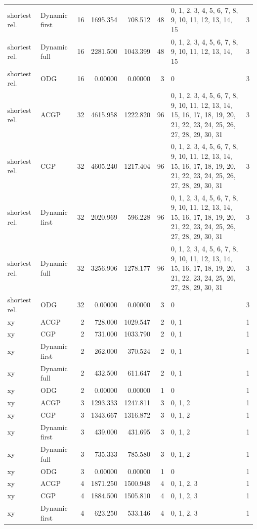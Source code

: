 \documentclass[10pt,a4paper]{article}
\begin{document}
\begin{longtable}{@{}p{23mm}p{29mm}rrrrp{36mm}r@{}}
shortest rel. & Dynamic first & 16 & 1695.354 & 708.512 & 48 & 0, 1, 2, 3, 4, 5, 6, 7, 8, 9, 10, 11, 12, 13, 14, 15 & 3 \\
shortest rel. & Dynamic full & 16 & 2281.500 & 1043.399 & 48 & 0, 1, 2, 3, 4, 5, 6, 7, 8, 9, 10, 11, 12, 13, 14, 15 & 3 \\
shortest rel. & ODG & 16 & 0.00000 & 0.00000 & 3 & 0 & 3 \\
shortest rel. & ACGP & 32 & 4615.958 & 1222.820 & 96 & 0, 1, 2, 3, 4, 5, 6, 7, 8, 9, 10, 11, 12, 13, 14, 15, 16, 17, 18, 19, 20, 21, 22, 23, 24, 25, 26, 27, 28, 29, 30, 31 & 3 \\
shortest rel. & CGP & 32 & 4605.240 & 1217.404 & 96 & 0, 1, 2, 3, 4, 5, 6, 7, 8, 9, 10, 11, 12, 13, 14, 15, 16, 17, 18, 19, 20, 21, 22, 23, 24, 25, 26, 27, 28, 29, 30, 31 & 3 \\
shortest rel. & Dynamic first & 32 & 2020.969 & 596.228 & 96 & 0, 1, 2, 3, 4, 5, 6, 7, 8, 9, 10, 11, 12, 13, 14, 15, 16, 17, 18, 19, 20, 21, 22, 23, 24, 25, 26, 27, 28, 29, 30, 31 & 3 \\
shortest rel. & Dynamic full & 32 & 3256.906 & 1278.177 & 96 & 0, 1, 2, 3, 4, 5, 6, 7, 8, 9, 10, 11, 12, 13, 14, 15, 16, 17, 18, 19, 20, 21, 22, 23, 24, 25, 26, 27, 28, 29, 30, 31 & 3 \\
shortest rel. & ODG & 32 & 0.00000 & 0.00000 & 3 & 0 & 3 \\
xy & ACGP & 2 & 728.000 & 1029.547 & 2 & 0, 1 & 1 \\
xy & CGP & 2 & 731.000 & 1033.790 & 2 & 0, 1 & 1 \\
xy & Dynamic first & 2 & 262.000 & 370.524 & 2 & 0, 1 & 1 \\
xy & Dynamic full & 2 & 432.500 & 611.647 & 2 & 0, 1 & 1 \\
xy & ODG & 2 & 0.00000 & 0.00000 & 1 & 0 & 1 \\
xy & ACGP & 3 & 1293.333 & 1247.811 & 3 & 0, 1, 2 & 1 \\
xy & CGP & 3 & 1343.667 & 1316.872 & 3 & 0, 1, 2 & 1 \\
xy & Dynamic first & 3 & 439.000 & 431.695 & 3 & 0, 1, 2 & 1 \\
xy & Dynamic full & 3 & 735.333 & 785.580 & 3 & 0, 1, 2 & 1 \\
xy & ODG & 3 & 0.00000 & 0.00000 & 1 & 0 & 1 \\
xy & ACGP & 4 & 1871.250 & 1500.948 & 4 & 0, 1, 2, 3 & 1 \\
xy & CGP & 4 & 1884.500 & 1505.810 & 4 & 0, 1, 2, 3 & 1 \\
xy & Dynamic first & 4 & 623.250 & 533.146 & 4 & 0, 1, 2, 3 & 1 \\

\end{longtable}
\end{document}
